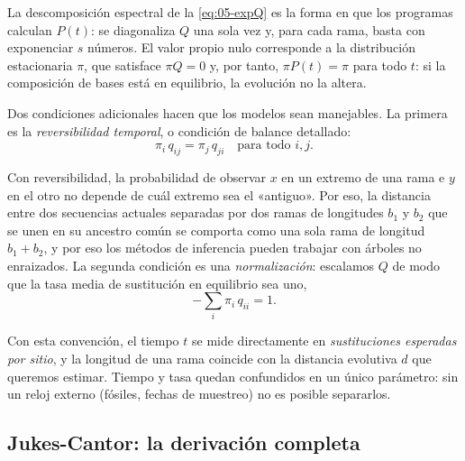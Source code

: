 La descomposición espectral de la \cref{eq:05-expQ} es la forma en que los programas calculan $P(t)$: se diagonaliza $Q$ una sola vez y, para cada rama, basta con exponenciar $s$ números. El valor propio nulo corresponde a la distribución estacionaria $\pi$, que satisface $\pi Q=0$ y, por tanto, $\pi P(t)=\pi$ para todo $t$: si la composición de bases está en equilibrio, la evolución no la altera.

Dos condiciones adicionales hacen que los modelos sean manejables. La primera es la \emph{reversibilidad temporal}, o condición de balance detallado:
\begin{equation}\label{eq:05-reversible}
\pi_i\, q_{ij} = \pi_j\, q_{ji}\quad\text{para todo } i,j.
\end{equation}

\begin{simbolos}
\end{simbolos}

Con reversibilidad, la probabilidad de observar $x$ en un extremo de una rama e $y$ en el otro no depende de cuál extremo sea el «antiguo». Por eso, la distancia entre dos secuencias actuales separadas por dos ramas de longitudes $b_1$ y $b_2$ que se unen en su ancestro común se comporta como una sola rama de longitud $b_1+b_2$, y por eso los métodos de inferencia pueden trabajar con árboles no enraizados. La segunda condición es una \emph{normalización}: escalamos $Q$ de modo que la tasa media de sustitución en equilibrio sea uno,
\begin{equation}\label{eq:05-norm}
-\sum_i \pi_i\, q_{ii} = 1.
\end{equation}

\begin{simbolos}
\end{simbolos}

Con esta convención, el tiempo $t$ se mide directamente en \emph{sustituciones esperadas por sitio}, y la longitud de una rama coincide con la distancia evolutiva $d$ que queremos estimar. Tiempo y tasa quedan confundidos en un único parámetro: sin un reloj externo (fósiles, fechas de muestreo) no es posible separarlos.

\subsection{Jukes-Cantor: la derivación completa}

